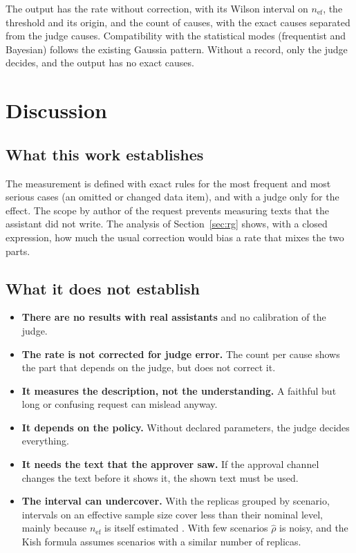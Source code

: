 \documentclass[11pt,a4paper]{article}
\begin{document}
The output has the rate without correction, with its Wilson interval on $n_{\mathrm{ef}}$, the threshold and its
origin, and the count of causes, with the exact causes separated from the judge causes. Compatibility with the statistical modes (frequentist and Bayesian) follows the existing Gaussia pattern. Without a
record, only the judge decides, and the output has no exact causes.

\section{Discussion}

\subsection{What this work establishes}

The measurement is defined with exact rules for the most frequent and most serious cases (an omitted or changed
data item), and with a judge only for the effect. The scope by author of the request prevents measuring texts that
the assistant did not write. The analysis of Section~\ref{sec:rg} shows, with a closed expression, how much the
usual correction would bias a rate that mixes the two parts.

\subsection{What it does not establish}

\begin{itemize}
  \item \textbf{There are no results with real assistants} and no calibration of the judge.
  \item \textbf{The rate is not corrected for judge error.} The count per cause shows the part that depends on
    the judge, but does not correct it.
  \item \textbf{It measures the description, not the understanding.} A faithful but long or confusing request
    can mislead anyway.
  \item \textbf{It depends on the policy.} Without declared parameters, the judge decides everything.
  \item \textbf{It needs the text that the approver saw.} If the approval channel changes the text before it
    shows it, the shown text must be used.
  \item \textbf{The interval can undercover.} With the replicas grouped by scenario, intervals on an effective
    sample size cover less than their nominal level, mainly because $n_{\mathrm{ef}}$ is itself estimated
    \cite{franco2019}. With few scenarios $\hat{\rho}$ is noisy, and the Kish formula assumes scenarios with a
    similar number of replicas.
\end{itemize}
\end{document}
